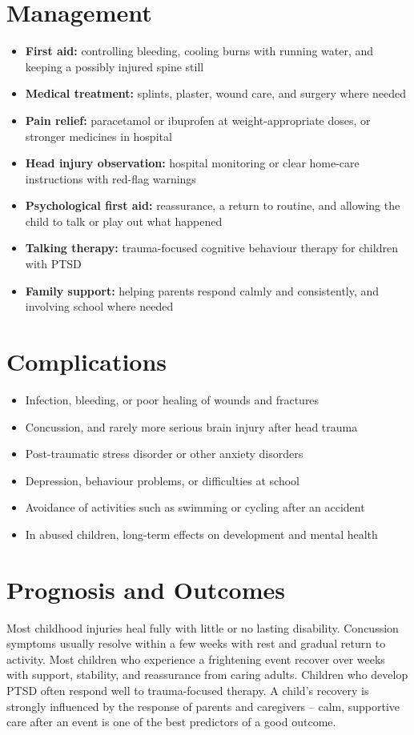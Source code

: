 \section*{Management}
\begin{itemize}
    \item \textbf{First aid:} controlling bleeding, cooling burns with running water, and keeping a possibly injured spine still
    \item \textbf{Medical treatment:} splints, plaster, wound care, and surgery where needed
    \item \textbf{Pain relief:} paracetamol or ibuprofen at weight-appropriate doses, or stronger medicines in hospital
    \item \textbf{Head injury observation:} hospital monitoring or clear home-care instructions with red-flag warnings
    \item \textbf{Psychological first aid:} reassurance, a return to routine, and allowing the child to talk or play out what happened
    \item \textbf{Talking therapy:} trauma-focused cognitive behaviour therapy for children with PTSD
    \item \textbf{Family support:} helping parents respond calmly and consistently, and involving school where needed
\end{itemize}

\section*{Complications}
\begin{itemize}
    \item Infection, bleeding, or poor healing of wounds and fractures
    \item Concussion, and rarely more serious brain injury after head trauma
    \item Post-traumatic stress disorder or other anxiety disorders
    \item Depression, behaviour problems, or difficulties at school
    \item Avoidance of activities such as swimming or cycling after an accident
    \item In abused children, long-term effects on development and mental health
\end{itemize}

\section*{Prognosis and Outcomes}
Most childhood injuries heal fully with little or no lasting disability. Concussion symptoms usually resolve within a few weeks with rest and gradual return to activity. Most children who experience a frightening event recover over weeks with support, stability, and reassurance from caring adults. Children who develop PTSD often respond well to trauma-focused therapy. A child's recovery is strongly influenced by the response of parents and caregivers -- calm, supportive care after an event is one of the best predictors of a good outcome.

